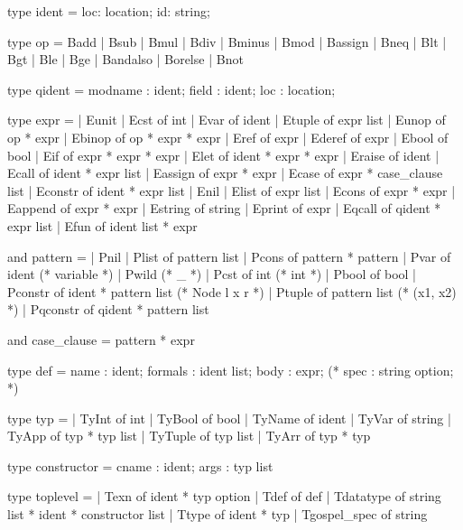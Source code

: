 \begin{ocamlenv}
    type ident = { loc: location; id: string; }

    type op = Badd | Bsub | Bmul | Bdiv | Bminus | Bmod | Bassign | Bneq | Blt | Bgt 
    | Ble | Bge | Bandalso | Borelse | Bnot

    type qident = {
    modname : ident; 
    field   : ident; 
    loc     : location;
    }

    type expr =
    | Eunit
    | Ecst           of int
    | Evar           of ident
    | Etuple         of expr list
    | Eunop          of op * expr
    | Ebinop         of op * expr * expr
    | Eref           of expr
    | Ederef         of expr
    | Ebool          of bool
    | Eif            of expr * expr * expr
    | Elet           of ident * expr * expr
    | Eraise         of ident
    | Ecall          of ident * expr list
    | Eassign        of expr * expr
    | Ecase          of expr * case_clause list
    | Econstr        of ident * expr list
    | Enil
    | Elist          of expr list
    | Econs          of expr * expr 
    | Eappend        of expr * expr
    | Estring        of string
    | Eprint         of expr
    | Eqcall         of qident * expr list
    | Efun           of ident list * expr

    and pattern =
    | Pnil
    | Plist   of pattern list
    | Pcons   of pattern * pattern
    | Pvar    of ident (* variable *)
    | Pwild (* _ *)
    | Pcst    of int (* int *)
    | Pbool   of bool
    | Pconstr of ident * pattern list (* Node l x r *)
    | Ptuple  of pattern list (* (x1, x2) *)
    | Pqconstr of qident * pattern list

    and case_clause = pattern * expr

    type def = {
    name    : ident; 
    formals : ident list; 
    body    : expr;
    (* spec    : string option; *)
    }

    type typ = 
    | TyInt   of int
    | TyBool  of bool
    | TyName  of ident
    | TyVar   of string
    | TyApp   of typ * typ list
    | TyTuple of typ list
    | TyArr   of typ * typ

    type constructor = {
    cname : ident;
    args : typ list
    }

    type toplevel = 
    | Texn         of ident * typ option
    | Tdef         of def
    | Tdatatype    of string list * ident * constructor list
    | Ttype        of ident * typ
    | Tgospel_spec of string
\end{ocamlenv}

